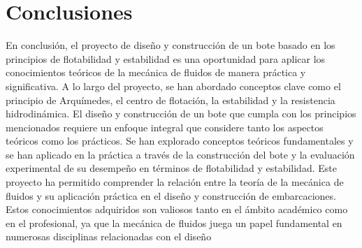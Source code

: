\documentclass[a4paper,letterpaper]{article}
\begin{document}
\section*{Conclusiones}
En conclusión, el proyecto de diseño y construcción de un bote basado en los principios de flotabilidad y estabilidad es una oportunidad para aplicar los conocimientos teóricos de la mecánica de fluidos de manera práctica y significativa. A lo largo del proyecto, se han abordado conceptos clave como el principio de Arquímedes, el centro de flotación, la estabilidad y la resistencia hidrodinámica.
El diseño y construcción de un bote que cumpla con los principios mencionados requiere un enfoque integral que considere tanto los aspectos teóricos como los prácticos. Se han explorado conceptos teóricos fundamentales y se han aplicado en la práctica a través de la construcción del bote y la evaluación experimental de su desempeño en términos de flotabilidad y estabilidad.
Este proyecto ha permitido comprender la relación entre la teoría de la mecánica de fluidos y su aplicación práctica en el diseño y construcción de embarcaciones. Estos conocimientos adquiridos son valiosos tanto en el ámbito académico como en el profesional, ya que la mecánica de fluidos juega un papel fundamental en numerosas disciplinas relacionadas con el diseño


\newpage
\section*{}

\nocite{*}

\end{document}
